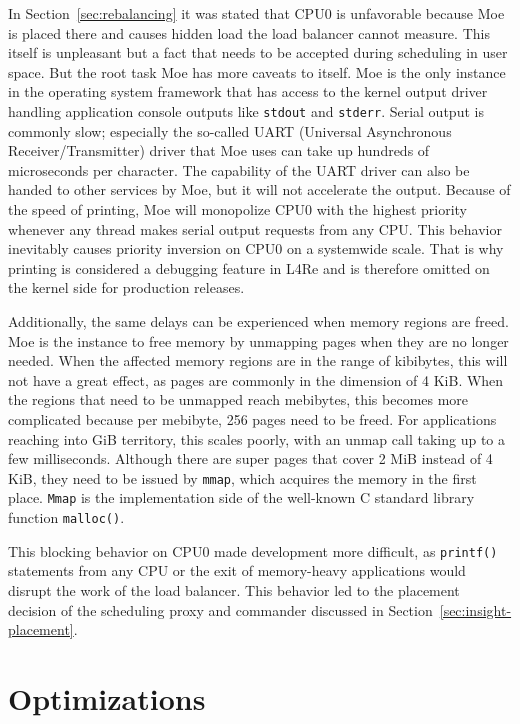 In Section~\ref{sec:rebalancing} it was stated that CPU0 is unfavorable because Moe is placed there and causes hidden load the load balancer cannot measure.
This itself is unpleasant but a fact that needs to be accepted during scheduling in user space.
But the root task Moe has more caveats to itself.
Moe is the only instance in the operating system framework that has access to the kernel output driver handling application console outputs like \texttt{stdout} and \texttt{stderr}.
Serial output is commonly slow; especially the so-called UART (Universal Asynchronous Receiver/Transmitter) driver that Moe uses can take up hundreds of microseconds per character.
The capability of the UART driver can also be handed to other services by Moe, but it will not accelerate the output.
Because of the speed of printing, Moe will monopolize CPU0 with the highest priority whenever any thread makes serial output requests from any CPU.
This behavior inevitably causes priority inversion on CPU0 on a systemwide scale.
That is why printing is considered a debugging feature in L4Re and is therefore omitted on the kernel side for production releases.

Additionally, the same delays can be experienced when memory regions are freed.
Moe is the instance to free memory by unmapping pages when they are no longer needed.
When the affected memory regions are in the range of kibibytes, this will not have a great effect, as pages are commonly in the dimension of 4 KiB.
When the regions that need to be unmapped reach mebibytes, this becomes more complicated because per mebibyte, 256 pages need to be freed.
For applications reaching into GiB territory, this scales poorly, with an unmap call taking up to a few milliseconds.
Although there are super pages that cover 2 MiB instead of 4 KiB, they need to be issued by \texttt{mmap}, which acquires the memory in the first place.
\texttt{Mmap} is the implementation side of the well-known C standard library function \texttt{malloc()}.

This blocking behavior on CPU0 made development more difficult, as \texttt{printf()} statements from any CPU or the exit of memory-heavy applications would disrupt the work of the load balancer.
This behavior led to the placement decision of the scheduling proxy and commander discussed in Section~\ref{sec:insight-placement}.

\section{Optimizations}
\label{sec:impl:optimizations}

